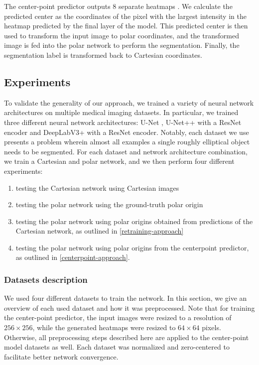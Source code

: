 The center-point predictor outputs 8 separate heatmaps \cite{newellStackedHourglassNetworks2016}. We
calculate the predicted center as the coordinates of the pixel with the largest intensity in the heatmap
predicted by the final layer of the model. This predicted center is then used to transform the input
image to polar coordinates, and the transformed image is fed into the polar network to perform
the segmentation. Finally, the segmentation label is transformed back to Cartesian coordinates.
    
  \subsection{Experiments} \label{experiments}
  
To validate the generality of our approach, we trained a variety of neural network architectures on 
multiple medical imaging datasets. In particular, we trained three different neural network 
architectures: U-Net \cite{ronnebergerUNetConvolutionalNetworks2015}, U-Net++ 
\citet{zhouUNetNestedUNet2018} with a ResNet encoder and DeepLabV3+ 
\cite{chenEncoderDecoderAtrousSeparable2018} with a ResNet encoder. Notably, each dataset we use presents a problem wherein almost all examples a single roughly elliptical object needs to be segmented. 
For each dataset and network architecture combination, we train a Cartesian and polar network, and we then 
perform four different experiments: 

\begin{enumerate}
	\item{testing the Cartesian network using Cartesian images}
	\item{testing the polar network using the ground-truth polar origin}
	\item{testing the polar network using polar origins obtained from predictions of the Cartesian network, as outlined in \ref{retraining-approach}}
	\item{testing the polar network using polar origins from the centerpoint predictor, as outlined in \ref{centerpoint-approach}}.
\end{enumerate}

    \subsubsection{Datasets description}

We used four different datasets to train the network. In this section, we give an overview of each used dataset and how it was preprocessed. Note that for training the center-point predictor, the input images were resized to a resolution of $256 \times 256$, while the generated heatmaps were resized to $64 \times 64$ pixels. Otherwise, all preprocessing steps described here are applied to the center-point model datasets as well. Each dataset was normalized and zero-centered to facilitate better network convergence. 

